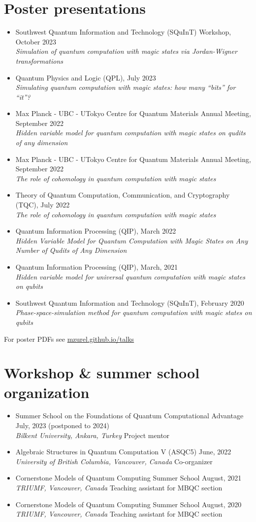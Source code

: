 \documentclass[letterpaper,11pt]{article}
\newcommand{\ConferenceItem}[3]{
	\item{\parbox{0.97\textwidth}{
		{#1}  \hfill {#2}\\
		\emph{#3}
	}}
}
\newcommand{\OrganizerItem}[4]{
	\item{\parbox{0.97\textwidth}{
			{#1} \hfill {#2}\\
			\emph{#3} \hfill {#4}
		}}
}
\begin{document}
\section*{Poster presentations}
\begin{itemize}[leftmargin=*]
	\ConferenceItem{Southwest Quantum Information and Technology (SQuInT) Workshop, October 2023}{}{Simulation of quantum computation with magic states via Jordan-Wigner transformations}
	
	\ConferenceItem{Quantum Physics and Logic (QPL), July 2023}{}{Simulating quantum computation with magic states: how many ``bits'' for ``it''?}
	
	\ConferenceItem{Max Planck - UBC - UTokyo Centre for Quantum Materials Annual Meeting, September 2022}{}{Hidden variable model for quantum computation with magic states on qudits of any dimension}
	
	\ConferenceItem{Max Planck - UBC - UTokyo Centre for Quantum Materials Annual Meeting, September 2022}{}{The role of cohomology in quantum computation with magic states}
	
	\ConferenceItem{Theory of Quantum Computation, Communication, and Cryptography (TQC), July 2022}{}{The role of cohomology in quantum computation with magic states}
	
	\ConferenceItem{Quantum Information Processing (QIP), March 2022}{}{Hidden Variable Model for Quantum Computation with Magic States on Any Number of Qudits of Any Dimension}
	
	\ConferenceItem{Quantum Information Processing (QIP), March, 2021}{}{Hidden variable model for universal quantum computation with magic states on qubits}
	
	\ConferenceItem{Southwest Quantum Information and Technology (SQuInT), February 2020}{}{Phase-space-simulation method for quantum computation with magic states on qubits}
\end{itemize}
For poster PDFs see \href{https://mzurel.github.io/talks}{mzurel.github.io/talks}

\section*{Workshop \& summer school organization}
\begin{itemize}[leftmargin=*]
	\OrganizerItem{Summer School on the Foundations of Quantum Computational Advantage}{July, 2023 (postponed to 2024)}{Bilkent University, Ankara, Turkey}{Project mentor}
	\OrganizerItem{Algebraic Structures in Quantum Computation V (ASQC5)}{June, 2022}{University of British Columbia, Vancouver, Canada}{Co-organizer}
	\OrganizerItem{Cornerstone Models of Quantum Computing Summer School}{August, 2021}{TRIUMF, Vancouver, Canada}{Teaching assistant for MBQC section}
	\OrganizerItem{Cornerstone Models of Quantum Computing Summer School}{August, 2020}{TRIUMF, Vancouver, Canada}{Teaching assistant for MBQC section}
\end{itemize}
\end{document}
